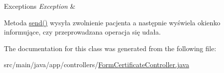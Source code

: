 \begin{DoxyExceptions}{Exceptions}
{\em Exception} & \\
\hline
\end{DoxyExceptions}
Metoda \mbox{\hyperlink{classapp_1_1controllers_1_1_form_certificate_controller_aac1957fec1cdad0c0c65873c8835391e}{send()}} wysyła zwolnienie pacjenta a następnie wyświela okienko informujące, czy przeprowadzana operacja się udała. 

The documentation for this class was generated from the following file\+:\begin{DoxyCompactItemize}
\item 
src/main/java/app/controllers/\mbox{\hyperlink{_form_certificate_controller_8java}{Form\+Certificate\+Controller.\+java}}\end{DoxyCompactItemize}
